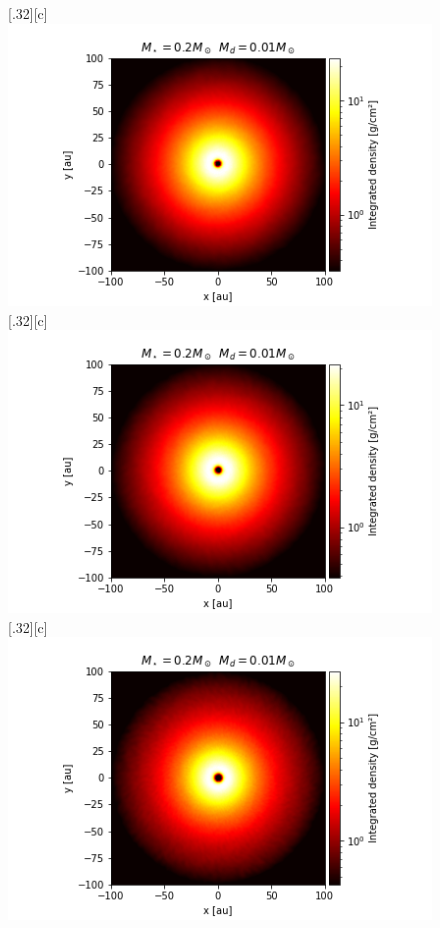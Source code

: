 \documentclass[aps,prb,twocolumn,superscriptaddress,floatfix,longbibliography]{revtex4-2}
\begin{document}
\begin{appendices}
\begin{figure}[!htbp]
  \subcaptionbox*{}[.32\linewidth][c]{%
    \includegraphics[width=1\linewidth]{Graphs_2D/r_0.2s_0.01d_0.3q_2D.png}}\quad
    \vspace{-2\baselineskip}
  \subcaptionbox*{}[.32\linewidth][c]{%
    \includegraphics[width=\linewidth]{Graphs_2D/r_0.2s_0.01d_0.5q_2D.png}}\quad
  \subcaptionbox*{}[.32\linewidth][c]{%
    \includegraphics[width=\linewidth]{Graphs_2D/r_0.2s_0.01d_0.7q_2D.png}}\quad 

\end{figure}
\end{appendices}
\end{document}

